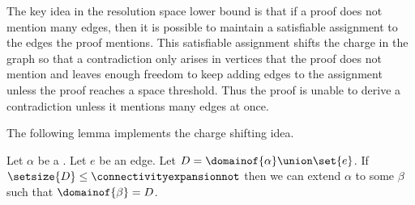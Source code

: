 \documentclass{toc}
\begin{document}
The key idea in the resolution space lower bound is that if a proof does not mention many edges, then it is possible to maintain a satisfiable assignment to the edges the proof mentions. This satisfiable assignment shifts the charge in the graph so that a contradiction only arises in vertices that the proof does not mention and leaves enough freedom to keep adding edges to the assignment unless the proof reaches a space threshold. Thus the proof is unable to derive a contradiction unless it mentions many edges at once.

The following lemma implements the charge shifting idea. 

\begin{lemma}
  \label{lem:extend-non-splitting}
  Let $\alpha$ be a \nonsplittingassignment. Let $e$ be an edge. Let $D=\domainof{\alpha}\union\set{e}$. If $\setsize{D}\leq \connectivityexpansionnot$ then we can extend $\alpha$ to some \nonsplittingassignment $\beta$ such that $\domainof{\beta}=D$.
\end{lemma}
\end{document}
